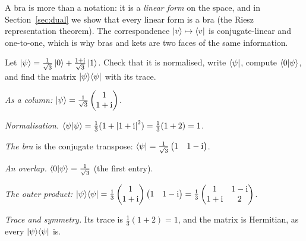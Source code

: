 A bra is more than a notation: it is a \emph{linear form} on the space, and in Section~\ref{sec:dual} we show that every linear form is a bra (the Riesz representation theorem). The correspondence $\left|v\right\rangle\mapsto\left\langle v\right|$ is conjugate-linear and one-to-one, which is why bras and kets are two faces of the same information.

\begin{example}\label{ex:kets}
  Let $\left|\psi\right\rangle=\frac1{\sqrt3}\left|0\right\rangle+\frac{1+\mathrm{i}}{\sqrt3}\left|1\right\rangle$. Check that it is normalised, write $\left\langle\psi\right|$, compute $\left\langle0\middle|\psi\right\rangle$, and find the matrix $\left|\psi\right\rangle\!\left\langle\psi\right|$ with its trace.
\end{example}
\begin{solution}
  \begin{steps}
    \item \emph{As a column:} $\left|\psi\right\rangle=\frac1{\sqrt3}\begin{pmatrix}1\\1+\mathrm{i}\end{pmatrix}$.
    \item \emph{Normalisation.} $\left\langle\psi\middle|\psi\right\rangle=\frac13(1+\left|1+\mathrm{i}\right|^2)=\frac13(1+2)=1$.
    \item \emph{The bra} is the conjugate transpose: $\left\langle\psi\right|=\frac1{\sqrt3}\begin{pmatrix}1&1-\mathrm{i}\end{pmatrix}$.
    \item \emph{An overlap.} $\left\langle0\middle|\psi\right\rangle=\frac1{\sqrt3}$ (the first entry).
    \item \emph{The outer product:} $\left|\psi\right\rangle\!\left\langle\psi\right|=\frac13\begin{pmatrix}1\\1+\mathrm{i}\end{pmatrix}\begin{pmatrix}1&1-\mathrm{i}\end{pmatrix}=\frac13\begin{pmatrix}1&1-\mathrm{i}\\1+\mathrm{i}&2\end{pmatrix}$.
    \item \emph{Trace and symmetry.} Its trace is $\tfrac13(1+2)=1$, and the matrix is Hermitian, as every $\left|\psi\right\rangle\!\left\langle\psi\right|$ is.
  \end{steps}
\end{solution}

